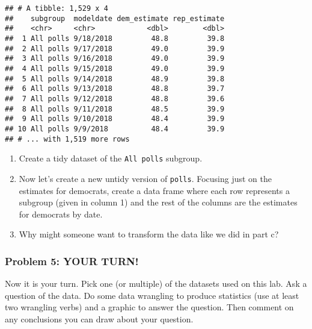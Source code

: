 \documentclass[]{article}
\begin{document}
\begin{verbatim}
## # A tibble: 1,529 x 4
##    subgroup  modeldate dem_estimate rep_estimate
##    <chr>     <chr>            <dbl>        <dbl>
##  1 All polls 9/18/2018         48.8         39.8
##  2 All polls 9/17/2018         49.0         39.9
##  3 All polls 9/16/2018         49.0         39.9
##  4 All polls 9/15/2018         49.0         39.9
##  5 All polls 9/14/2018         48.9         39.8
##  6 All polls 9/13/2018         48.8         39.7
##  7 All polls 9/12/2018         48.8         39.6
##  8 All polls 9/11/2018         48.5         39.9
##  9 All polls 9/10/2018         48.4         39.9
## 10 All polls 9/9/2018          48.4         39.9
## # ... with 1,519 more rows
\end{verbatim}

\begin{enumerate}
\def\labelenumi{\alph{enumi}.}
\setcounter{enumi}{1}
\item
  Create a tidy dataset of the \texttt{All\ polls} subgroup.
\item
  Now let's create a new untidy version of \texttt{polls}. Focusing just
  on the estimates for democrats, create a data frame where each row
  represents a subgroup (given in column 1) and the rest of the columns
  are the estimates for democrats by date.
\item
  Why might someone want to transform the data like we did in part c?
\end{enumerate}

\subsubsection{Problem 5: YOUR TURN!}\label{problem-5-your-turn}

Now it is your turn. Pick one (or multiple) of the datasets used on this
lab. Ask a question of the data. Do some data wrangling to produce
statistics (use at least two wrangling verbs) and a graphic to answer
the question. Then comment on any conclusions you can draw about your
question.
\end{document}
